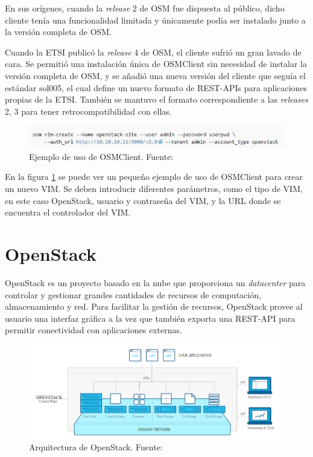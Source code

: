En sus orígenes, cuando la \textit{release} 2 de \ac{OSM} fue dispuesta al público, dicho cliente tenía una funcionalidad limitada y únicamente podía ser instalado junto a la versión completa de \ac{OSM}.

Cuando la \ac{ETSI} publicó la \textit{release} 4 de \ac{OSM}, el cliente sufrió un gran lavado de cara. Se permitió una instalación única de OSMClient sin necesidad de instalar la versión completa de \ac{OSM}, y se añadió una nueva versión del cliente que seguía el estándar sol005\cite{sol005item}, el cual define un nuevo formato de REST-\acp{API} para aplicaciones propias de la \ac{ETSI}. También se mantuvo el formato correspondiente a las \textit{releases} 2, 3 para tener retrocompatibilidad con ellas.

\begin{figure}[!ht]
	\centering
	\includegraphics[width=0.95\linewidth]{imagenes/osmclientpython_example}
	\caption{Ejemplo de uso de OSMClient. Fuente:\cite{osmrel5bib}}
	\label{fig:osmclientpythonexample}
\end{figure}

En la figura \ref{fig:osmclientpythonexample} se puede ver un pequeño ejemplo de uso de OSMClient para crear un nuevo \ac{VIM}. Se deben introducir diferentes parámetros, como el tipo de \ac{VIM}, en este caso OpenStack, usuario y contraseña del \ac{VIM}, y la \ac{URL} donde se encuentra el controlador del \ac{VIM}.

\section{OpenStack}
\label{sec:openstack}

OpenStack\cite{openstackbib} es un proyecto basado en la nube que proporciona un \textit{datacenter} para controlar y gestionar grandes cantidades de recursos de computación, almacenamiento y red. Para facilitar la gestión de recursos, OpenStack provee al usuario una interfaz gráfica a la vez que también exporta una \ac{REST}-\ac{API} para permitir conectividad con aplicaciones externas.

\begin{figure}[!ht]
	\centering
	\includegraphics[width=0.9\linewidth]{imagenes/openstack_arch}
	\caption{Arquitectura de OpenStack. Fuente:\cite{openstackbib}}
	\label{fig:openstackarch}
\end{figure}

